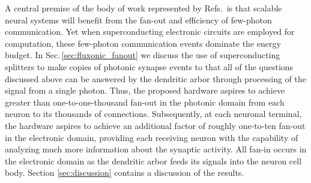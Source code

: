 \documentclass[twocolumn]{article}
\begin{document}
A central premise of the body of work represented by Refs.\,\cite{shbu2017,sh2018,sh2018_full,sh2018_ICRC} is that scalable neural systems will benefit from the fan-out and efficiency of few-photon communication. Yet when superconducting electronic circuits are employed for computation, these few-photon communication events dominate the energy budget. In Sec.\,\ref{sec:fluxonic_fanout} we discuss the use of superconducting splitters to make copies of photonic synapse events to that all of the questions discussed above can be answered by the dendritic arbor through processing of the signal from a single photon. Thus, the proposed hardware aspires to achieve greater than one-to-one-thousand fan-out in the photonic domain from each neuron to its thousands of connections. Subsequently, at each neuronal terminal, the hardware aspires to achieve an additional factor of roughly one-to-ten fan-out in the electronic domain, providing each receiving neuron with the capability of analyzing much more information about the synaptic activity. All fan-in occurs in the electronic domain as the dendritic arbor feeds its signals into the neuron cell body. Section \ref{sec:discussion} contains a discussion of the results.
\end{document}
